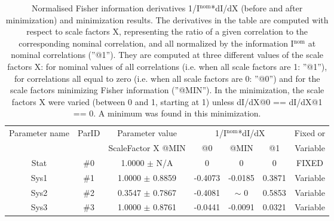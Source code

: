 \begin{table}[H]
\scriptsize
\begin{center}
\renewcommand{\arraystretch}{1.1}
\begin{tabular}{|c|c|c|ccc|c|}
\hline
Parameter name & ParID & Parameter value &\multicolumn{3}{|c|}{1/I$^\mathrm{nom}$*dI/dX} & Fixed or\\
 & & ScaleFactor X @MIN & @0 & @MIN & @1 & Variable\\
\hline
 {\tiny Stat} & \#0 &    1.0000 $\pm$ N/A & 0 & 0 & 0 & FIXED \\
 {\tiny Sys1} & \#1 &    1.0000 $\pm$    0.8859 &   -0.4073 &   -0.0185 &    0.3871 & Variable \\
 {\tiny Sys2} & \#2 &    0.3547 $\pm$    0.7867 &   -0.4081 & {\tiny $\sim$ }0 &    0.5853 & Variable \\
 {\tiny Sys3} & \#3 &    1.0000 $\pm$    0.8761 &   -0.0441 &   -0.0091 &    0.0321 & Variable \\
\hline
\end{tabular}
\renewcommand{\arraystretch}{1}
\caption{Normalised Fisher information derivatives 1/I$^\mathrm{nom}$*dI/dX (before and after minimization) and minimization results.  The derivatives in the table are computed with respect to scale factors X, representing the ratio of a given correlation to the corresponding nominal correlation, and all normalized by the information I$^\mathrm{nom}$ at nominal correlations (''@1''). They are computed at three different values of the scale factors X: for nominal values of all correlations (i.e. when all scale factors are 1: ''@1''), for correlations all equal to zero (i.e. when all scale factors are 0: ''@0'') and for the scale factors minimizing Fisher information (''@MIN''). In the minimization, the scale factors X were varied (between 0 and 1, starting at 1) unless dI/dX@0 == dI/dX@1 == 0. A minimum was found in this minimization.}
\end{center}
\end{table}
